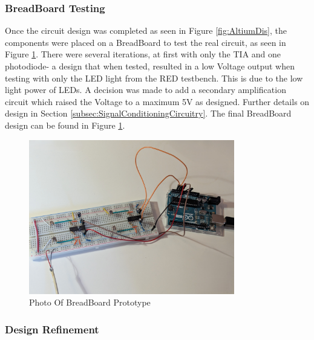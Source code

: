 %
%
\subsubsection*{BreadBoard Testing}

Once the circuit design was completed as seen in Figure  \ref{fig:AltiumDis}, the components were placed on a BreadBoard to test the real circuit, as seen in Figure \ref{fig:BreadBoardPhoto}. 
There were several iterations, at first with only the \ac{TIA} and one photodiode- a design that when tested, resulted in a low Voltage output when testing with only the \ac{LED} light from the \ac{RED} testbench. This is due to the low light power of \acp{LED}. A decision was made to add a secondary amplification circuit which raised the Voltage to a maximum 5V as designed. Further details on design in Section \ref{subsec:SignalConditioningCircuitry}. The final BreadBoard design can be found in Figure \ref{fig:BreadBoardPhoto}.



%
\begin{figure}[htbp] %
  \centering
  \includegraphics[width=0.8\textwidth]{chapters/methodology/prototype/BreadBoardPhoto.jpg}
  \caption{Photo Of BreadBoard Prototype}
  \label{fig:BreadBoardPhoto}
\end{figure}



\subsubsection*{Design Refinement}
\label{explainPostAmp}
